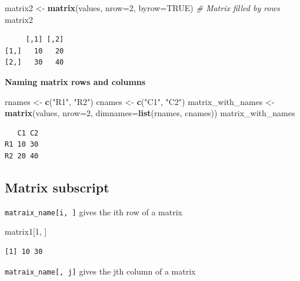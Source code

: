 \documentclass[]{book}
\newenvironment{Shaded}{\begin{snugshade}}{\end{snugshade}}
\newcommand{\CommentTok}[1]{\textcolor[rgb]{0.56,0.35,0.01}{\textit{#1}}}
\newcommand{\DataTypeTok}[1]{\textcolor[rgb]{0.13,0.29,0.53}{#1}}
\newcommand{\DecValTok}[1]{\textcolor[rgb]{0.00,0.00,0.81}{#1}}
\newcommand{\KeywordTok}[1]{\textcolor[rgb]{0.13,0.29,0.53}{\textbf{#1}}}
\newcommand{\NormalTok}[1]{#1}
\newcommand{\OtherTok}[1]{\textcolor[rgb]{0.56,0.35,0.01}{#1}}
\newcommand{\StringTok}[1]{\textcolor[rgb]{0.31,0.60,0.02}{#1}}
\begin{document}
\begin{Shaded}
\begin{Highlighting}[]
\NormalTok{matrix2 <-}\StringTok{ }\KeywordTok{matrix}\NormalTok{(values, }\DataTypeTok{nrow=}\DecValTok{2}\NormalTok{, }\DataTypeTok{byrow=}\OtherTok{TRUE}\NormalTok{) }\CommentTok{# Matrix filled by rows}
\NormalTok{matrix2}
\end{Highlighting}
\end{Shaded}

\begin{verbatim}
     [,1] [,2]
[1,]   10   20
[2,]   30   40
\end{verbatim}

\textbf{Naming matrix rows and columns}

\begin{Shaded}
\begin{Highlighting}[]
\NormalTok{rnames <-}\StringTok{ }\KeywordTok{c}\NormalTok{(}\StringTok{"R1"}\NormalTok{, }\StringTok{"R2"}\NormalTok{)}
\NormalTok{cnames <-}\StringTok{ }\KeywordTok{c}\NormalTok{(}\StringTok{"C1"}\NormalTok{, }\StringTok{"C2"}\NormalTok{)}
\NormalTok{matrix_with_names <-}\StringTok{ }\KeywordTok{matrix}\NormalTok{(values, }\DataTypeTok{nrow=}\DecValTok{2}\NormalTok{, }\DataTypeTok{dimnames=}\KeywordTok{list}\NormalTok{(rnames, cnames))}
\NormalTok{matrix_with_names}
\end{Highlighting}
\end{Shaded}

\begin{verbatim}
   C1 C2
R1 10 30
R2 20 40
\end{verbatim}

\hypertarget{matrix-subscript}{%
\subsection{Matrix subscript}\label{matrix-subscript}}

\texttt{matraix\_name{[}i,\ {]}} gives the ith row of a matrix

\begin{Shaded}
\begin{Highlighting}[]
\NormalTok{matrix1[}\DecValTok{1}\NormalTok{, ]}
\end{Highlighting}
\end{Shaded}

\begin{verbatim}
[1] 10 30
\end{verbatim}

\texttt{matraix\_name{[},\ j{]}} gives the jth column of a matrix
\end{document}
